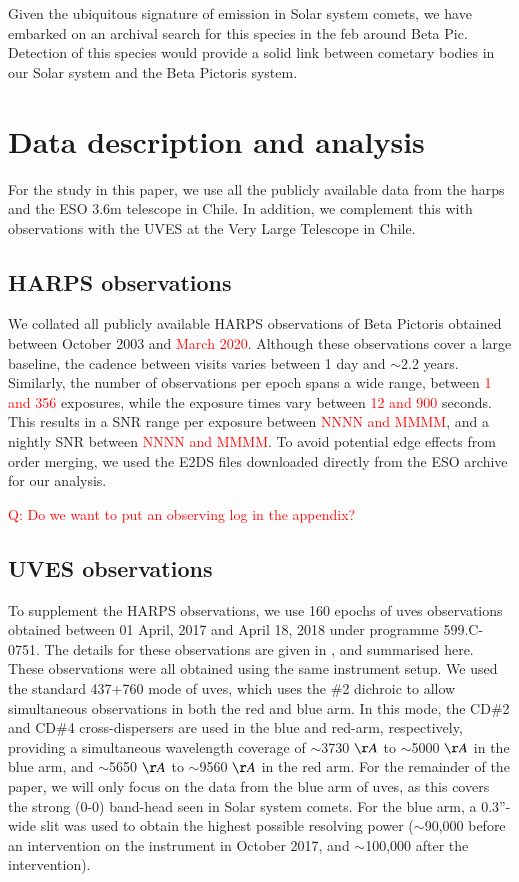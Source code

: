 \documentclass{aa}
\newcommand{\bp}{Beta Pictoris}
\begin{document}
Given the ubiquitous signature of  emission in Solar system comets, we have embarked on an archival search for this species in the \ac{feb} around Beta Pic.
%
Detection of this species would provide a solid link between cometary bodies in our Solar system and the \bp{} system.

\section{Data description and analysis}

For the study in this paper, we use all the publicly available data from the \ac{harps} and the ESO 3.6m telescope in Chile.
%
In addition, we complement this with observations with the \ac{UVES} at the Very Large Telescope in Chile. 

\subsection{HARPS observations}

We collated all publicly available HARPS observations of \bp{} obtained between October 2003 and \textcolor{red}{March 2020}.
%
Although these observations cover a large baseline, the cadence between visits varies between 1 day and $\sim$2.2 years.
%
Similarly, the number of observations per epoch spans a wide range, between \textcolor{red}{1 and 356} exposures, while the exposure times vary between \textcolor{red}{12 and 900} seconds. This results in a SNR range per exposure between \textcolor{red}{NNNN and MMMM}, and a nightly SNR between \textcolor{red}{NNNN and MMMM}.
%
To avoid potential edge effects from order merging,  we used the E2DS files downloaded directly from the ESO archive for our analysis.

\textcolor{red}{Q: Do we want to put an observing log in the appendix?}

\subsection{UVES observations}

To supplement the HARPS observations, we use 160 epochs of \ac{uves} observations obtained between 01 April, 2017 and April 18, 2018 under programme 599.C-0751.
%
The details for these observations are given in \cite{vansluijs2019}, and summarised here.
%
These observations were all obtained using the same instrument setup.
%
We used the standard 437+760 mode of \ac{uves}, which uses the \#2 dichroic to allow simultaneous observations in both the red and blue arm.
%
In this mode, the CD\#2 and CD\#4 cross-dispersers are used in the blue and red-arm, respectively, providing a simultaneous wavelength coverage of $\sim$3730 $\AA$  to $\sim$5000 $\AA$ in the blue arm, and $\sim$5650 $\AA$ to $\sim$9560 $\AA$ in the red arm.
%
For the remainder of the paper, we will only focus on the data from the blue arm of \ac{uves}, as this covers the strong  (0-0) band-head seen in Solar system comets.
%
For the blue arm, a 0.3''-wide slit was used to obtain the highest possible resolving power ($\sim$90,000 before an intervention on the instrument in October 2017, and $\sim$100,000 after the intervention). 
\end{document}
